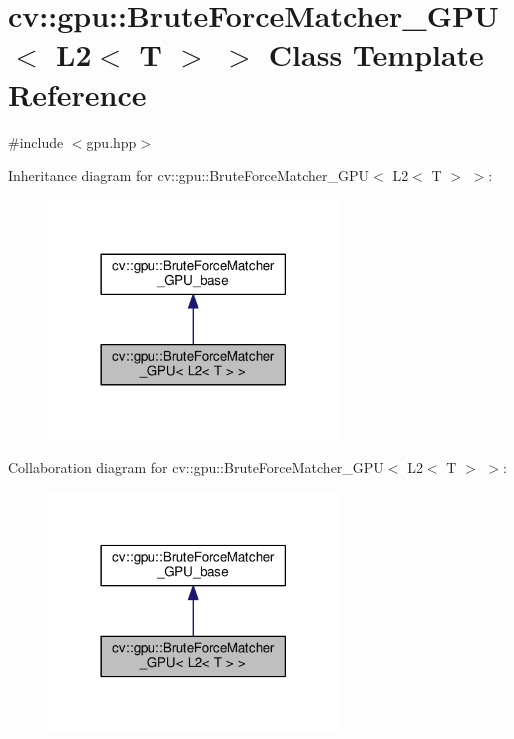 \hypertarget{classcv_1_1gpu_1_1BruteForceMatcher__GPU_3_01L2_3_01T_01_4_01_4}{\section{cv\-:\-:gpu\-:\-:Brute\-Force\-Matcher\-\_\-\-G\-P\-U$<$ L2$<$ T $>$ $>$ Class Template Reference}
\label{classcv_1_1gpu_1_1BruteForceMatcher__GPU_3_01L2_3_01T_01_4_01_4}
}


{\ttfamily \#include $<$gpu.\-hpp$>$}



Inheritance diagram for cv\-:\-:gpu\-:\-:Brute\-Force\-Matcher\-\_\-\-G\-P\-U$<$ L2$<$ T $>$ $>$\-:\nopagebreak
\begin{figure}[H]
\begin{center}
\leavevmode
\includegraphics[width=218pt]{classcv_1_1gpu_1_1BruteForceMatcher__GPU_3_01L2_3_01T_01_4_01_4__inherit__graph}
\end{center}
\end{figure}


Collaboration diagram for cv\-:\-:gpu\-:\-:Brute\-Force\-Matcher\-\_\-\-G\-P\-U$<$ L2$<$ T $>$ $>$\-:\nopagebreak
\begin{figure}[H]
\begin{center}
\leavevmode
\includegraphics[width=218pt]{classcv_1_1gpu_1_1BruteForceMatcher__GPU_3_01L2_3_01T_01_4_01_4__coll__graph}
\end{center}
\end{figure}
